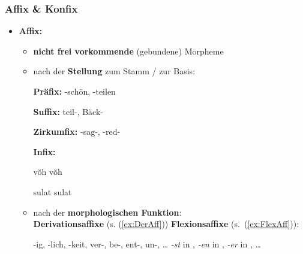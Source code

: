 \begin{frame}
\frametitle{Affix \& Konfix}

\begin{itemize}
	\item \textbf{Affix:}
	
	\begin{itemize}
		\item \textbf{nicht frei vorkommende} (gebundene) Morpheme
		
		\item nach der \textbf{Stellung} zum Stamm / zur Basis:
		
		\settowidth{} 
		\ea
			\ea \textbf{Präfix:} -schön, -teilen
		
			\ex \textbf{Suffix:} teil-, Bäck-
		
			\ex \textbf{Zirkumfix:} -sag-, -red-
		
			\ex \textbf{Infix:} 
			
			 v\u{o}h  \ras v\u{o}h  
			 
			sulat  \ras sulat  
		
			\z 
		\z 

\pause 
		
		\item nach der \textbf{morphologischen Funktion}: \\
		\textbf{Derivationsaffixe} (s. (\ref{ex:DerAff})) \vs \textbf{Flexionsaffixe} (s.\ (\ref{ex:FlexAff})):
		
		\ea 
		\ea\label{ex:DerAff} -ig, -lich, -keit, ver-, be-, ent-, un-, \dots
		\ex\label{ex:FlexAff} \emph{-st} in , \emph{-en} in , \emph{-er} in , \dots
		\z
		\z 
	\end{itemize}
\end{itemize}
\end{frame}


